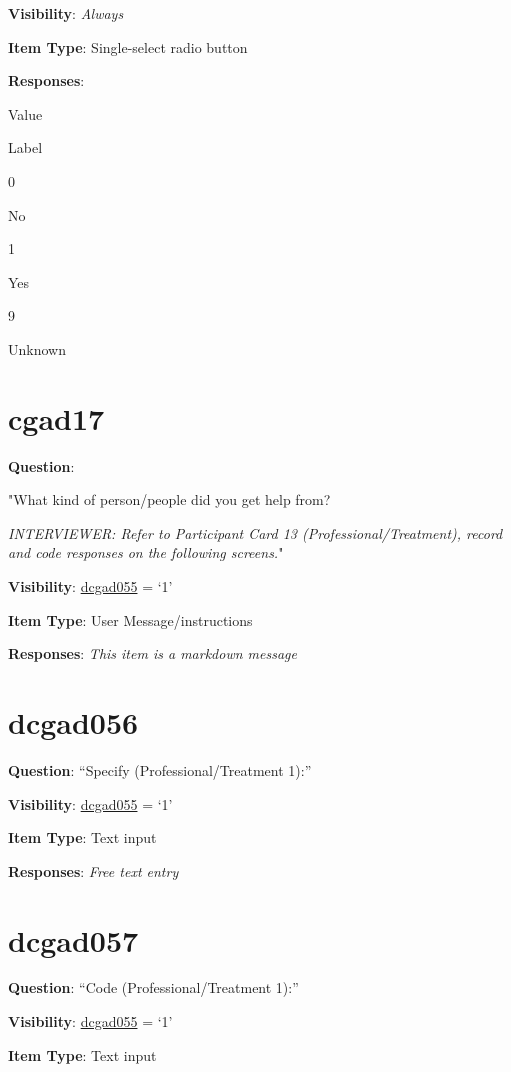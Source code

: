 \documentclass[]{book}
\begin{document}
\textbf{Visibility}: \emph{Always}

\textbf{Item Type}: Single-select radio button

\textbf{Responses}:

Value

Label

0

No

1

Yes

9

Unknown

\hypertarget{cgad17}{%
\section{cgad17}\label{cgad17}}

\textbf{Question}:

"What kind of person/people did you get help from?

\emph{INTERVIEWER: Refer to Participant Card 13 (Professional/Treatment), record and code responses on the following screens.}"

\textbf{Visibility}: \protect\hyperlink{dcgad055}{dcgad055} = `1'

\textbf{Item Type}: User Message/instructions

\textbf{Responses}: \emph{This item is a markdown message}

\hypertarget{dcgad056}{%
\section{dcgad056}\label{dcgad056}}

\textbf{Question}: ``Specify (Professional/Treatment 1):''

\textbf{Visibility}: \protect\hyperlink{dcgad055}{dcgad055} = `1'

\textbf{Item Type}: Text input

\textbf{Responses}: \emph{Free text entry}

\hypertarget{dcgad057}{%
\section{dcgad057}\label{dcgad057}}

\textbf{Question}: ``Code (Professional/Treatment 1):''

\textbf{Visibility}: \protect\hyperlink{dcgad055}{dcgad055} = `1'

\textbf{Item Type}: Text input
\end{document}
